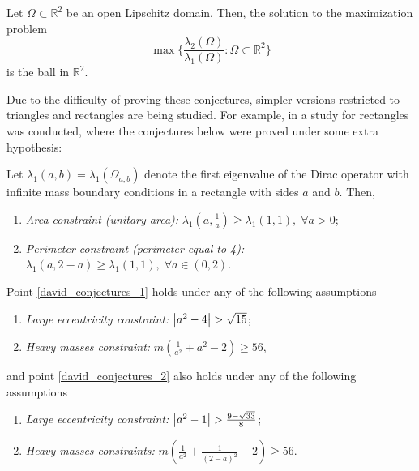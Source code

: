 \begin{conjecture}\label{conjecture_benguria}
    Let \(\Omega \subset \mathbb{R}^2\) be an open Lipschitz domain. Then, the solution to the maximization problem 
    \[
    \max \Big\{\frac{\lambda_2(\Omega)}{\lambda_1(\Omega)}: \Omega \subset \mathbb{R}^2\Big\}
    \]
    is the ball in \(\mathbb{R}^2\).
\end{conjecture}


Due to the difficulty of proving these conjectures, simpler versions restricted to triangles and rectangles are being studied. For example, in \cite{briet2022spectral} a study for rectangles was conducted, where the conjectures below were proved under some extra hypothesis:

\begin{conjecture}\label{david_conjectures}
    Let \(\lambda_1(a, b) = \lambda_1(\Omega_{a, b})\) denote the first eigenvalue of the Dirac operator with infinite mass boundary conditions in a rectangle with sides \(a\) and \(b\). Then,
    \begin{enumerate}
        \item \label{david_conjectures_1} \textit{Area constraint (unitary area): } \(\lambda_1(a, \frac{1}{a}) \geq \lambda_1(1, 1), \; \forall a>0 \);
        \item  \label{david_conjectures_2} \textit{Perimeter constraint (perimeter equal to 4): } \(\lambda_1(a, 2-a) \geq \lambda_1(1, 1), \; \forall a\in (0, 2)\).
    \end{enumerate}
    Point \ref{david_conjectures_1} holds under any of the following assumptions
    \begin{enumerate}
        \item \textit{Large eccentricity constraint: } \(\abs{a^2-4} > \sqrt{15}\);
        \item \textit{Heavy masses constraint: } \(m \left(\frac{1}{a^2}+a^2-2\right) \geq 56\),
    \end{enumerate}
    and point \ref{david_conjectures_2} also holds under any of the following assumptions
    \begin{enumerate}
        \item \textit{Large eccentricity constraint: } \(\abs{a^2-1} > \frac{9-\sqrt{33}}{8}\);
        \item \textit{Heavy masses constraints: } \(m \left(\frac{1}{a^2}+\frac{1}{(2-a)^2}-2\right) \geq 56\).
    \end{enumerate}
\end{conjecture}

